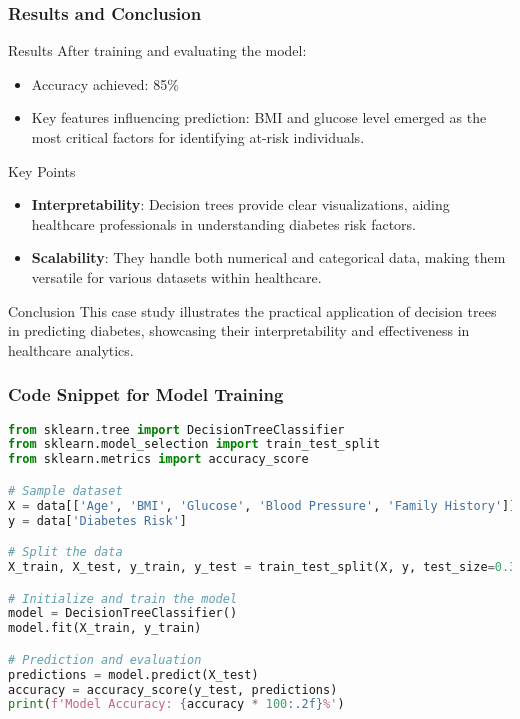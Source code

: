 \documentclass[aspectratio=169]{beamer}
\begin{document}
\begin{frame}
    \frametitle{Results and Conclusion}

    \begin{block}{Results}
        After training and evaluating the model:
        \begin{itemize}
            \item Accuracy achieved: 85\%
            \item Key features influencing prediction: BMI and glucose level emerged as the most critical factors for identifying at-risk individuals.
        \end{itemize}
    \end{block}

    \begin{block}{Key Points}
        \begin{itemize}
            \item \textbf{Interpretability}: Decision trees provide clear visualizations, aiding healthcare professionals in understanding diabetes risk factors.
            \item \textbf{Scalability}: They handle both numerical and categorical data, making them versatile for various datasets within healthcare.
        \end{itemize}
    \end{block}

    \begin{block}{Conclusion}
        This case study illustrates the practical application of decision trees in predicting diabetes, showcasing their interpretability and effectiveness in healthcare analytics.
    \end{block}
\end{frame}

\begin{frame}[fragile]
    \frametitle{Code Snippet for Model Training}
    \begin{lstlisting}[language=Python]
from sklearn.tree import DecisionTreeClassifier
from sklearn.model_selection import train_test_split
from sklearn.metrics import accuracy_score

# Sample dataset
X = data[['Age', 'BMI', 'Glucose', 'Blood Pressure', 'Family History']]
y = data['Diabetes Risk']

# Split the data
X_train, X_test, y_train, y_test = train_test_split(X, y, test_size=0.3, random_state=42)

# Initialize and train the model
model = DecisionTreeClassifier()
model.fit(X_train, y_train)

# Prediction and evaluation
predictions = model.predict(X_test)
accuracy = accuracy_score(y_test, predictions)
print(f'Model Accuracy: {accuracy * 100:.2f}%')
    \end{lstlisting}
\end{frame}
\end{document}
